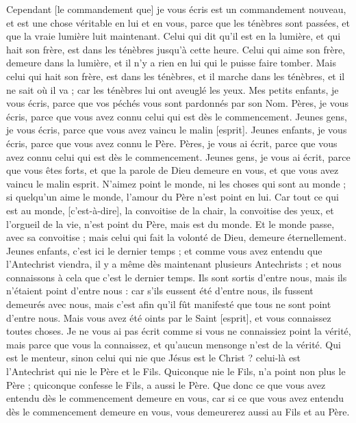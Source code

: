\begin{multicols}{2}
Cependant [le commandement que] je vous écris est un commandement nouveau, et est une chose véritable en lui et en vous, parce que les ténèbres sont passées, et que la vraie lumière luit maintenant.
Celui qui dit qu'il est en la lumière, et qui hait son frère, est dans les ténèbres jusqu'à cette heure.
Celui qui aime son frère, demeure dans la lumière, et il n'y a rien en lui qui le puisse faire tomber.
Mais celui qui hait son frère, est dans les ténèbres, et il marche dans les ténèbres, et il ne sait où il va ; car les ténèbres lui ont aveuglé les yeux.
Mes petits enfants, je vous écris, parce que vos péchés vous sont pardonnés par son Nom.
Pères, je vous écris, parce que vous avez connu celui qui est dès le commencement. Jeunes gens, je vous écris, parce que vous avez vaincu le malin [esprit].
Jeunes enfants, je vous écris, parce que vous avez connu le Père. Pères, je vous ai écrit, parce que vous avez connu celui qui est dès le commencement. Jeunes gens, je vous ai écrit, parce que vous êtes forts, et que la parole de Dieu demeure en vous, et que vous avez vaincu le malin esprit.
N'aimez point le monde, ni les choses qui sont au monde ; si quelqu'un aime le monde, l'amour du Père n'est point en lui.
Car tout ce qui est au monde, [c'est-à-dire], la convoitise de la chair, la convoitise des yeux, et l'orgueil de la vie, n'est point du Père, mais est du monde.
Et le monde passe, avec sa convoitise ; mais celui qui fait la volonté de Dieu, demeure éternellement.
Jeunes enfants, c'est ici le dernier temps ; et comme vous avez entendu que l'Antechrist viendra, il y a même dès maintenant plusieurs Antechrists ; et nous connaissons à cela que c'est le dernier temps.
Ils sont sortis d'entre nous, mais ils n'étaient point d'entre nous : car s'ils eussent été d'entre nous, ils fussent demeurés avec nous, mais c'est afin qu'il fût manifesté que tous ne sont point d'entre nous.
Mais vous avez été oints par le Saint [esprit], et vous connaissez toutes choses.
Je ne vous ai pas écrit comme si vous ne connaissiez point la vérité, mais parce que vous la connaissez, et qu'aucun mensonge n'est de la vérité.
Qui est le menteur, sinon celui qui nie que Jésus est le Christ ? celui-là est l'Antechrist qui nie le Père et le Fils.
Quiconque nie le Fils, n'a point non plus le Père ; quiconque confesse le Fils, a aussi le Père.
Que donc ce que vous avez entendu dès le commencement demeure en vous, car si ce que vous avez entendu dès le commencement demeure en vous, vous demeurerez aussi au Fils et au Père.

\end{multicols}
